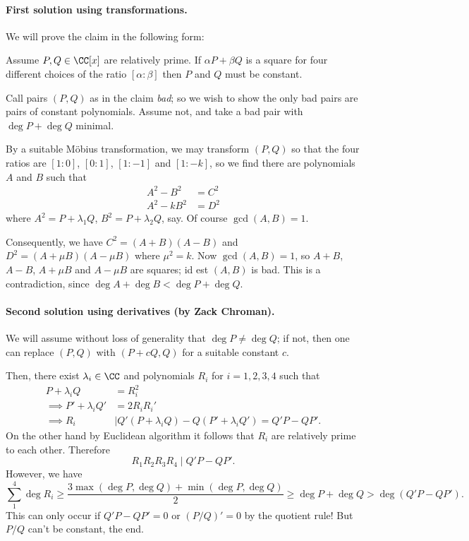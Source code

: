 \documentclass[11pt]{scrartcl}
\begin{document}
\paragraph{First solution using transformations.}
We will prove the claim in the following form:

\begin{claim*}
Assume $P, Q \in \CC[x]$ are relatively prime.
If $\alpha P + \beta Q$ is a square for four different
choices of the ratio $[\alpha : \beta]$
then $P$ and $Q$ must be constant.
\end{claim*}

Call pairs $(P,Q)$ as in the claim \emph{bad};
so we wish to show the only bad pairs are pairs of constant polynomials.
Assume not, and take a bad pair with $\deg P + \deg Q$ minimal.

By a suitable M\"obius transformation,
we may transform $(P,Q)$ so that the four ratios are $[1:0]$,
$[0:1]$, $[1:-1]$ and $[1:-k]$,
so we find there are polynomials $A$ and $B$ such that
\begin{align*}
  A^2 - B^2 &= C^2 \\
  A^2 - k B^2 &= D^2
\end{align*}
where $A^2 = P+\lambda_1 Q$, $B^2 = P+\lambda_2 Q$, say.
Of course $\gcd(A,B) = 1$.

Consequently, we have $C^2 = (A+B)(A-B)$
and $D^2 = (A+\mu B)(A-\mu B)$ where $\mu^2 = k$.
Now $\gcd(A,B) = 1$, so $A+B$, $A-B$, $A+ \mu B$ and $A - \mu B$
are squares; id est $(A,B)$ is bad.
This is a contradiction, since $\deg A + \deg B < \deg P + \deg Q$.

\paragraph{Second solution using derivatives (by Zack Chroman).}
We will assume without loss of generality that $\deg P \neq \deg Q$;
if not, then one can replace $(P,Q)$ with $(P+cQ,Q)$
for a suitable constant $c$.

Then, there exist $\lambda_i \in \CC$ and polynomials $R_i$
for $i=1,2,3,4$ such that
\begin{align*}
  P + \lambda_i Q &= R_i^2 \\
  \implies P' + \lambda_i Q' &= 2 R_i R_i' \\
  \implies R_i &\mid Q'(P+\lambda_i Q) - Q(P' + \lambda_i Q')
  = Q'P - QP'.
\end{align*}
On the other hand by Euclidean algorithm it follows that
$R_i$ are relatively prime to each other.
Therefore
\[ R_1 R_2 R_3 R_4 \mid Q' P - Q P'. \]
However, we have
\[ \sum_1^4 \deg R_i \ge
  \frac{3\max(\deg P, \deg Q) + \min(\deg P, \deg Q)}{2}
  \ge \deg P + \deg Q > \deg(Q'P - QP').  \]
This can only occur if $Q'P - QP' = 0$ or $(P/Q)' = 0$
by the quotient rule!
But $P/Q$ can't be constant, the end.
\end{document}
